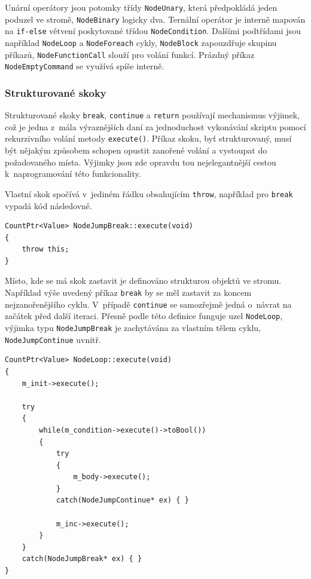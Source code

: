 \documentclass[11pt,twoside,a4paper]{book}
\begin{document}
Unární operátory jsou potomky třídy \texttt{NodeUnary}, která předpokládá jeden poduzel ve stromě, \texttt{NodeBinary} logicky dva. Ternální operátor je interně mapován na \texttt{if-else} větvení poskytované třídou \texttt{NodeCondition}. Dalšími podtřídami jsou například \texttt{Node\-Loop} a \texttt{NodeForeach} cykly, \texttt{NodeBlock} zapouzdřuje skupinu příkazů, \texttt{Node\-Function\-Call} slouží pro volání funkcí. Prázdný příkaz \texttt{NodeEmptyCommand} se využívá spíše interně.


\subsubsection{Strukturované skoky}

Strukturované skoky \texttt{break}, \texttt{continue} a \texttt{return} používají mechanismus výjimek, což je jedna z~mála výraznějších daní za jednoduchost vykonávání skriptu pomocí rekurzivního volání metody \texttt{execute()}. Příkaz skoku, byť strukturovaný, musí být nějakým způsobem schopen opustit zanořené volání a vystoupat do požadovaného místa. Výjimky jsou zde opravdu tou nejelegantnější cestou k~naprogramování této funkcionality.

Vlastní skok spočívá v~jediném řádku obsahujícím \texttt{throw}, například pro \texttt{break} vypadá kód následovně.

\begin{verbatim}
CountPtr<Value> NodeJumpBreak::execute(void)
{
    throw this;
}
\end{verbatim}

Místo, kde se má skok zastavit je definováno strukturou objektů ve stromu. Například výše uvedený příkaz \texttt{break} by se měl zastavit za koncem nejzanořenějšího cyklu. V~případě \texttt{continue} se samozřejmě jedná o~návrat na začátek před další iteraci. Přesně podle této definice funguje uzel \texttt{NodeLoop}, výjimka typu \texttt{NodeJumpBreak} je zachytávána za vlastním tělem cyklu, \texttt{NodeJumpContinue} uvnitř.

\begin{verbatim}
CountPtr<Value> NodeLoop::execute(void)
{
    m_init->execute();

    try
    {
        while(m_condition->execute()->toBool())
        {
            try
            {
                m_body->execute();
            }
            catch(NodeJumpContinue* ex) { }

            m_inc->execute();
        }
    }
    catch(NodeJumpBreak* ex) { }
}
\end{verbatim}
\end{document}
